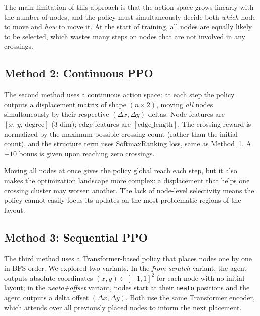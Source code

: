 \documentclass[10pt,twocolumn]{article}
\begin{document}
The main limitation of this approach is that the action space grows linearly
with the number of nodes, and the policy must simultaneously decide both
\emph{which} node to move and \emph{how} to move it.  At the start of
training, all nodes are equally likely to be selected, which wastes many
steps on nodes that are not involved in any crossings.

\subsection{Method 2: Continuous PPO}

The second method uses a continuous action space: at each step the policy
outputs a displacement matrix of shape $(n \times 2)$, moving \emph{all}
nodes simultaneously by their respective $(\Delta x, \Delta y)$ deltas.
Node features are $[x,\, y,\, \text{degree}]$ (3-dim); edge features are
$[\text{edge\_length}]$.  The crossing reward is normalized by the maximum
possible crossing count (rather than the initial count), and the structure
term uses SoftmaxRanking loss, same as Method~1.  A $+10$ bonus is given
upon reaching zero crossings.

Moving all nodes at once gives the policy global reach each step, but it
also makes the optimization landscape more complex: a displacement that
helps one crossing cluster may worsen another.  The lack of node-level
selectivity means the policy cannot easily focus its updates on the most
problematic regions of the layout.

\subsection{Method 3: Sequential PPO}

The third method uses a Transformer-based policy that places nodes one by one
in BFS order.  We explored two variants.  In the \emph{from-scratch} variant,
the agent outputs absolute coordinates $(x, y) \in [-1,1]^2$ for each node
with no initial layout; in the \emph{neato+offset} variant, nodes start at
their \texttt{neato} positions and the agent outputs a delta offset
$(\Delta x, \Delta y)$.  Both use the same Transformer encoder, which attends
over all previously placed nodes to inform the next placement.
\end{document}

